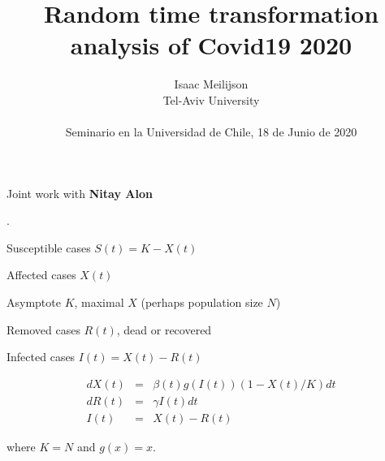 \documentclass{article}
\begin{document}
\date{}


\title {Random time transformation analysis of Covid19 2020
}

\author {
Isaac Meilijson
\\
{Tel-Aviv University} \\
\\
{Seminario en la Universidad de Chile, 18 de Junio de 2020}
}



\maketitle


\bigskip

\begin{center}

\noindent Joint work with {\bf Nitay Alon}

\end{center}

\newpage



.

\bigskip

\noindent Susceptible cases $S(t) = K - X(t)$

\noindent Affected cases $X(t)$

\noindent Asymptote $K$, maximal $X$ (perhaps population size $N$)

\noindent Removed cases $R(t)$, dead or recovered

\noindent Infected cases $I(t)=X(t)-R(t)$

\begin{eqnarray}
dX(t) & = & \beta(t) g(I(t)) (1 - X(t)/K) dt \nonumber \\
dR(t) & = & \gamma I(t) dt \nonumber \\
I(t) & = & X(t)-R(t) \nonumber
\end{eqnarray}

\noindent where $K=N$ and $g(x)=x$.

\bigskip
\end{document}
